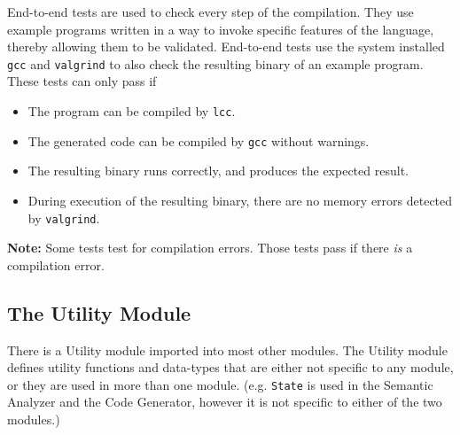 \documentclass[12pt]{article}
\begin{document}
End-to-end tests are used to check every step of the compilation. They use
example programs written in a way to invoke specific features of the language,
thereby allowing them to be validated. End-to-end tests use the system installed
\verb$gcc$ and \verb$valgrind$ to also check the resulting binary of an example
program. These tests can only pass if
\begin{itemize}
    \item The program can be compiled by \verb$lcc$.
    \item The generated code can be compiled by \verb$gcc$ without warnings.
    \item The resulting binary runs correctly, and produces the expected result.
    \item During execution of the resulting binary, there are no memory errors
        detected by \verb$valgrind$.
\end{itemize}
\textbf{Note:} Some tests test for compilation errors. Those tests pass if there
\emph{is} a compilation error.

\subsection{The Utility Module}

There is a Utility module imported into most other modules. The Utility module
defines utility functions and data-types that are either not specific to any module, or they
are used in more than one module. (e.g. \verb$State$ is used in the Semantic
Analyzer and the Code Generator, however it is not specific to either of the two
modules.)
\end{document}
